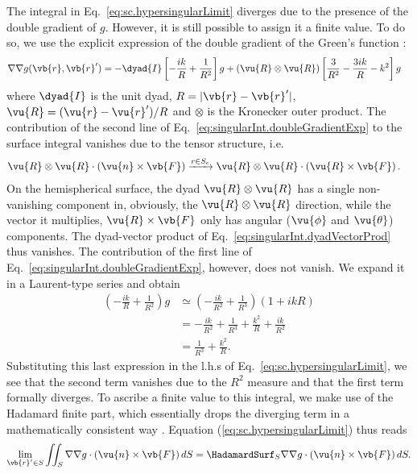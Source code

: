 \documentclass[11pt,SymmetricalJury]{inrsthesis/inrsthesis}
\begin{document}
The integral in Eq.~\eqref{eq:sc.hypersingularLimit} diverges due to the presence
of the double gradient of $g$. However, it is still possible to assign it a finite
value.
To do so, we use the explicit
expression of the double gradient of the Green's function \cite[Eq. (2.61)]{Volakis2012}:
  \begin{align}
    \label{eq:singularInt.doubleGradientExp}
    \nabla\nabla g(\vb{r},\vb{r}')  &= -\dyad{I}\left[-\frac{ik}{R}+\frac{1}{R^2}\right]g
                    +\left(\vu{R}\otimes\vu{R}\right)\left[\frac{3}{R^2}-\frac{3ik}{R}-k^2\right]g
  \end{align}
where $\dyad{I}$ is the unit dyad, $R=|\vb{r}-\vb{r}'|$, $\vu{R}=(\vu{r}-\vu{r}')/R$
and $\otimes$ is the Kronecker outer product. The contribution of the second line
of Eq.~\eqref{eq:singularInt.doubleGradientExp} to the surface integral
vanishes due to the tensor structure, i.e.
  \begin{align}
    \label{eq:singularInt.dyadVectorProd}
    \vu{R}\otimes\vu{R}\cdot\left(\vu{n}\times\vb{F}\right)&\xrightarrow{r\in S_\epsilon}
      \vu{R}\otimes\vu{R}\cdot\left(\vu{R}\times\vb{F}\right).
  \end{align}
On the hemispherical surface, the dyad $\vu{R}\otimes\vu{R}$ has a single
non-vanishing component in, obviously, the $\vu{R}\otimes\vu{R}$ direction, while the vector
it multiplies, $\vu{R}\times\vb{F}$ only has angular ($\vu{\phi}$ and $\vu{\theta}$)
components. The dyad-vector product
of Eq.~\eqref{eq:singularInt.dyadVectorProd} thus
vanishes. The contribution of the first line of Eq.~\eqref{eq:singularInt.doubleGradientExp}, however,
does not vanish. We expand it in a Laurent-type series and obtain
  \begin{align*}
    \left(-\frac{ik}{R}+\frac{1}{R^2}\right)g
      &\simeq \left(-\frac{ik}{R^2}+\frac{1}{R^3}\right)\left(1+ikR\right) \\
      &= -\frac{ik}{R^2}+\frac{1}{R^3}+\frac{k^2}{R}+\frac{ik}{R^2} \\
      &= \frac{1}{R^3}+\frac{k^2}{R}.
  \end{align*}
Substituting this last expression in the l.h.s of Eq.~\eqref{eq:sc.hypersingularLimit},
we see that the second term vanishes due to the $R^2$ measure and that the
first term formally diverges. To ascribe a finite value to this integral,
we make use of the Hadamard finite part, which essentially drops the diverging term
in a mathematically consistent way \cite{Blanchet2000}.
Equation (\ref{eq:sc.hypersingularLimit}) thus reads
  \begin{equation}
    \lim_{\vb{r}'\in S} \iint_S \nabla\nabla g \cdot\left(\vu{n}\times\vb{F}\right)dS
     = \HadamardSurf_S \nabla\nabla g\cdot\left(\vu{n}\times\vb{F}\right)dS.
  \end{equation}
\end{document}
